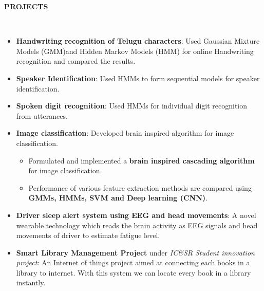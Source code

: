 \documentclass[a4paper,10pt]{article}
\newcommand{\lsep}{-0.5cm}
\newcommand{\resheading}[1]{{\small \colorbox{mygrey}{\begin{minipage}{0.975\textwidth}{\textbf{#1 \vphantom{p\^{E}}}}\end{minipage}}}}
\begin{document}
\resheading{\textbf{PROJECTS} }\\[\lsep]
\begin{itemize}
    \vspace{3pt}
    \item \textbf{Handwriting recognition of Telugu characters}: Used Gaussian Mixture Models (GMM)and Hidden Markov Models (HMM) for online Handwriting recognition and compared the results.
          \vspace{-5pt}
    \item \textbf{Speaker Identification}: Used HMMs to form sequential models for speaker identification.
          \vspace{-5pt}
    \item \textbf{Spoken digit recognition}: Used HMMs for individual digit recognition from utterances.
          \vspace{-5pt}
    \item \textbf{Image classification}: Developed brain inspired algorithm for image classification.
          \begin{itemize}
              \vspace{-5pt}
              \item Formulated and implemented a \textbf{brain inspired cascading algorithm} for image classification.
              \item Performance of various feature extraction methods are compared using \textbf{GMMs, HMMs, SVM and Deep learning (CNN)}.
                    \vspace{-5pt}
          \end{itemize}
    \item \textbf{Driver sleep alert system using EEG and head movements}: A novel wearable technology which reads the brain activity as EEG signals and head movements of driver to estimate fatigue level.\vspace{-5pt}
    \item \textbf{Smart Library Management Project} under \textit{IC\&SR Student innovation project}: An Internet of things project aimed at connecting each books in a library to internet. With this system we can locate every book in a library instantly.
\end{itemize}
\end{document}
